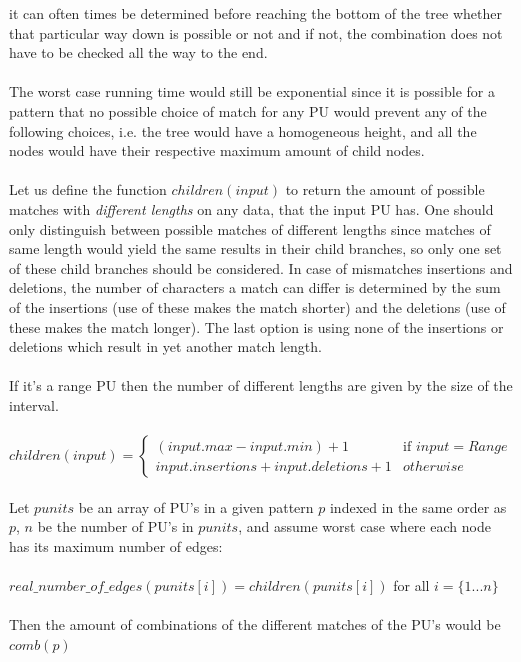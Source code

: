 \documentclass[12pt]{article}
\newcommand{\pu}{PU }
\newcommand{\pus}{PU's }
\begin{document}
it can often times be determined before
reaching the bottom of the tree whether that particular way down is possible or not and if not, the combination does
not have to be checked all the way to the end. \\ \\
The worst case running time would still be exponential since it is possible for a pattern that no possible choice of match
for any \pu would prevent any of the following choices, i.e. the tree would have a homogeneous height, and
all the nodes would have their respective maximum amount of child nodes. \\ \\
Let us define the function $children(input)$ to return the amount of possible matches with 
\textit{different lengths} on any data, that the input \pu has.
One should only distinguish between possible matches of different lengths since matches of same length would
yield the same results in their child branches, so only one set of these child branches should be considered.
In case of mismatches insertions and deletions, the number of characters a match can differ is determined by 
the sum of the insertions (use of these makes the match shorter)
and the deletions (use of these makes the match longer). The last option is using none of the insertions or deletions which
result in yet another match length. \\ \\
If it's a range \pu then the number of different lengths are given by the size of the interval. \\ \\
$children(input)=
\left\{
\begin{array}{ll}
(input.max - input.min) + 1 & \mbox{if } input=Range \\
input.insertions+input.deletions+1 & otherwise 
\end{array}
\right.$
 \\ \\
Let $punits$ be an array of \pus in a given pattern $p$ indexed in the same order as $p$, $n$ be the number of \pus in $punits$, 
and assume worst case where each node has its maximum number of edges: \\ \\
$real\_number\_of\_edges(punits[i])=children(punits[i])$\;\; for all $i=\{1...n\}$ \\ \\
Then the amount of combinations of the different matches of the \pus would be $comb(p)$ \\ \\
\end{document}
